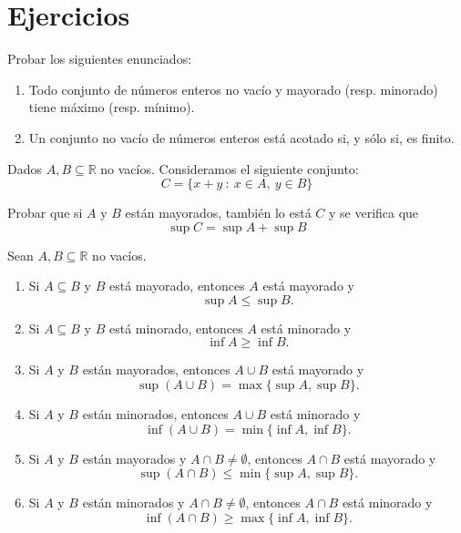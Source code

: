 
\section{Ejercicios}

\begin{ejercicio}
    Probar los siguientes enunciados:
    \begin{enumerate}
        \item Todo conjunto de números enteros no vacío y mayorado (resp. minorado) tiene máximo (resp. mínimo).
        \item Un conjunto no vacío de números enteros está acotado si, y sólo si, es finito.
    \end{enumerate}
\end{ejercicio}

\begin{ejercicio}
    Dados $A,B \subseteq \mathbb{R}$ no vacíos. Consideramos el siguiente conjunto:
    \begin{equation*}
        C = \{x+y ~:~ x \in A,~ y \in B\}
    \end{equation*}
    
    Probar que si $A$ y $B$ están mayorados, también lo está $C$ y se verifica que
    \begin{equation*}
        \sup C= \sup A + \sup B
    \end{equation*}
\end{ejercicio}

\begin{ejercicio}\label{ej:4.4.3}
    Sean $A,B \subseteq \mathbb{R}$ no vacíos.
    \begin{enumerate}
        \item Si $A \subseteq B$ y $B$ está mayorado, entonces $A$ está mayorado y $$\sup A \leq \sup B.$$

        \item Si $A \subseteq B$ y $B$ está minorado, entonces $A$ está minorado y $$\inf A \geq \inf B.$$

        \item Si $A$ y $B$ están mayorados, entonces $A \cup B$ está mayorado y $$\sup (A \cup B) = \max \{\sup A, \sup B\}.$$

        \item Si $A$ y $B$ están minorados, entonces $A \cup B$ está minorado y $$\inf (A \cup B) = \min \{\inf A, \inf B\}.$$

        \item Si $A$ y $B$ están mayorados y $A \cap B \neq \emptyset$, entonces $A \cap B$ está mayorado y $$\sup (A \cap B) \leq \min \{\sup A, \sup B\}.$$

        \item Si $A$ y $B$ están minorados y $A \cap B \neq \emptyset$, entonces $A \cap B$ está minorado y $$\inf (A \cap B) \geq \max \{\inf A, \inf B\}.$$
    \end{enumerate}
\end{ejercicio}

